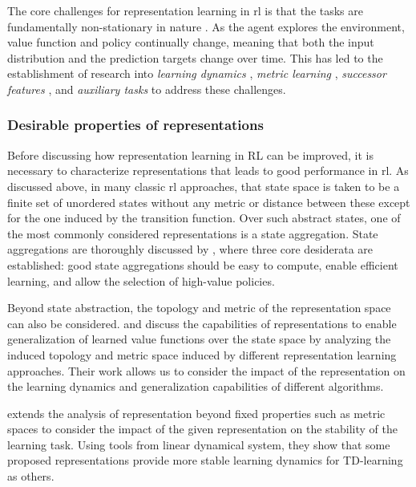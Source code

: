 The core challenges for representation learning in \ac{rl} is that the tasks are fundamentally non-stationary in nature \parencite{kumar2021implicit,nikishin2022primacy}.
As the agent explores the environment, value function and policy continually change, meaning that both the input distribution and the prediction targets change over time.
This has led to the establishment of research into \emph{learning dynamics} \parencite{lyle2022learning,lyle2022understanding}, \emph{metric learning} \parencite{ferns2011bisimulation,zhang2021learning,le2021metrics,kemertas2022approximate}, \emph{successor features} \parencite{barreto2017successor,borsa2018universal}, and \emph{auxiliary tasks} \parencite{jaderberg2017reinforcement,bellemare2019geometric,lyle2021effect,farebrother2023protovalue} to address these challenges.

\subsubsection{Desirable properties of representations}

Before discussing how representation learning in RL can be improved, it is necessary to characterize representations that leads to good performance in \ac{rl}.
As discussed above, in many classic \ac{rl} approaches, that state space is taken to be a finite set of unordered states without any metric or distance between these except for the one induced by the transition function.
Over such abstract states, one of the most commonly considered representations is a state aggregation.
State aggregations are thoroughly discussed by \textcite{abel2020thesis}, where three core desiderata are established: good state aggregations should be easy to compute, enable efficient learning, and allow the selection of high-value policies.

Beyond state abstraction, the topology and metric of the representation space can also be considered. 
\textcite{le2021metrics} and \textcite{lelan2022generalization} discuss the capabilities of representations to enable generalization of learned value functions over the state space by analyzing the induced topology and metric space induced by different representation learning approaches.
Their work allows us to consider the impact of the representation on the learning dynamics and generalization capabilities of different algorithms.

\textcite{ghosh2020representations} extends the analysis of representation beyond fixed properties such as metric spaces to consider the impact of the given representation on the stability of the learning task.
Using tools from linear dynamical system, they show that some proposed representations provide more stable learning dynamics for TD-learning as others.

